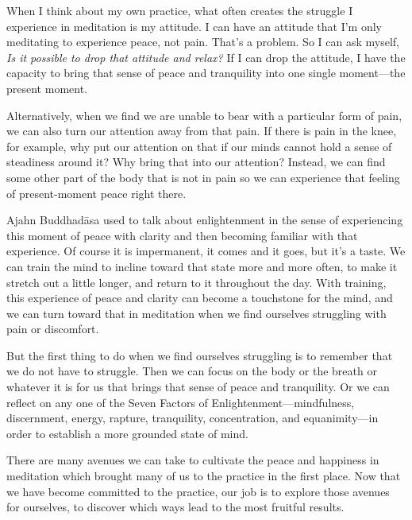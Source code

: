 When I think about my own practice, what often creates the struggle I 
experience in meditation is my attitude. I can have an attitude that 
I'm only meditating to experience peace, not pain. That's a problem. So 
I can ask myself, \emph{Is it possible to drop that attitude and 
relax?} If I can drop the attitude, I have the capacity to bring that 
sense of peace and tranquility into one single moment---the present 
moment.

Alternatively, when we find we are unable to bear with a particular 
form of pain, we can also turn our attention away from that pain. If 
there is pain in the knee, for example, why put our attention on that 
if our minds cannot hold a sense of steadiness around it? Why bring 
that into our attention? Instead, we can find some other part of the 
body that is not in pain so we can experience that feeling of 
present-moment peace right there.

Ajahn Buddhadāsa used to talk about enlightenment in the sense of 
experiencing this moment of peace with clarity and then becoming 
familiar with that experience. Of course it is impermanent, it comes 
and it goes, but it's a taste. We can train the mind to incline toward 
that state more and more often, to make it stretch out a little longer, 
and return to it throughout the day. With training, this experience of 
peace and clarity can become a touchstone for the mind, and we can turn 
toward that in meditation when we find ourselves struggling with pain 
or discomfort.

But the first thing to do when we find ourselves struggling is to 
remember that we do not have to struggle. Then we can focus on the body 
or the breath or whatever it is for us that brings that sense of peace 
and tranquility. Or we can reflect on any one of the Seven Factors of 
Enlightenment---mindfulness, discernment, energy, rapture, tranquility, 
concentration, and equanimity---in order to establish a more grounded 
state of mind.

There are many avenues we can take to cultivate the peace and happiness 
in meditation which brought many of us to the practice in the first 
place. Now that we have become committed to the practice, our job is to 
explore those avenues for ourselves, to discover which ways lead to the 
most fruitful results.


